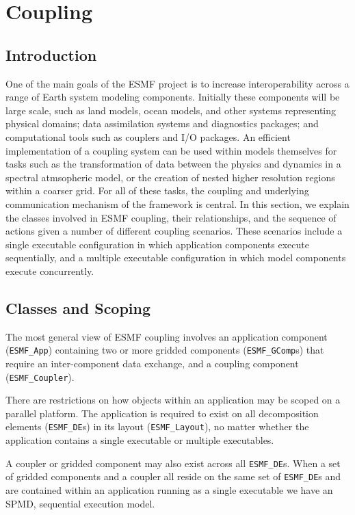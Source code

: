 \section{Coupling}

\subsection{Introduction}

One of the main goals of the ESMF project is to increase interoperability
across a range of Earth system modeling components.  Initially these 
components will be large scale, such as land models, ocean models, 
and other systems representing physical domains; data assimilation systems
and diagnostics packages; and computational tools such as couplers and 
I/O packages.  An efficient implementation of a coupling system can
be used within models themselves for tasks such
as the transformation of data between the physics and dynamics in a 
spectral atmsopheric model, or the creation of nested higher resolution 
regions within a coarser grid.  For all of these tasks, the coupling and 
underlying 
communication mechanism of the framework is central.  In this section, we 
explain the classes involved in ESMF coupling, their relationships, and 
the sequence of actions given a number of different coupling 
scenarios.  These scenarios include a single executable configuration in 
which application components execute sequentially, and a multiple executable
configuration in which model components execute concurrently.

\subsection{Classes and Scoping}

The most general view of ESMF coupling involves an application component
({\tt ESMF\_App})
containing two or more gridded components ({\tt ESMF\_GComp}s) that require an 
inter-component data exchange, and a coupling component ({\tt ESMF\_Coupler}).

There are restrictions on how objects within an application may be scoped
on a parallel platform.  The application is required to exist on all 
decomposition elements ({\tt ESMF\_DE}s) in its layout ({\tt ESMF\_Layout}), 
no matter whether the application contains a single executable or multiple 
executables.

A coupler or gridded component may also exist across all {\tt ESMF\_DE}s.  When 
a set of gridded  components and a coupler all reside on the same set of 
{\tt ESMF\_DE}s and are contained within an application running as a single 
executable we have an SPMD, sequential execution model.

